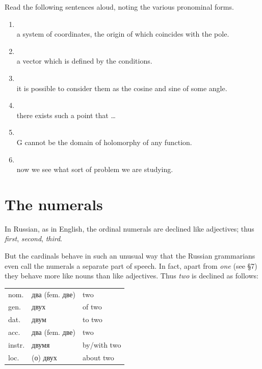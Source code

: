 \begin{keybox}[Exercise 3.4]
Read the following sentences aloud, noting the various pronominal forms.
\end{keybox}

\begin{enumerate}[label=\arabic*)]
\item {}\\
      a system of coordinates, the origin of which coincides with the pole.
\item {}\\
      a vector which is defined by the conditions.
\item {}\\
      it is possible to consider them as the cosine and sine of some angle.
\item {}\\
      there exists such a point that \ldots
\item {}\\
      G cannot be the domain of holomorphy of any function.
\item {}\\
      now we see what sort of problem we are studying.
\end{enumerate}


\section{The numerals}

In Russian, as in English, the ordinal numerals are declined like adjectives; thus  \emph{first},  \emph{second},  \emph{third}.

But the cardinals behave in such an unusual way that the Russian grammarians even call the numerals a separate part of speech. In fact, apart from  \emph{one} (see §7) they behave more like nouns than like adjectives. Thus  \emph{two} is declined as follows:

\begin{center}
\small
\begin{tabular}{@{}l >{\cyrillicfont}l l@{}}
\toprule
nom. & два (fem. две) & two\\
gen. & двух & of two\\
dat. & двум & to two\\
acc. & два (fem. две) & two\\
instr. & двумя & by/with two\\
loc. & (о) двух & about two\\
\bottomrule
\end{tabular}
\end{center}

